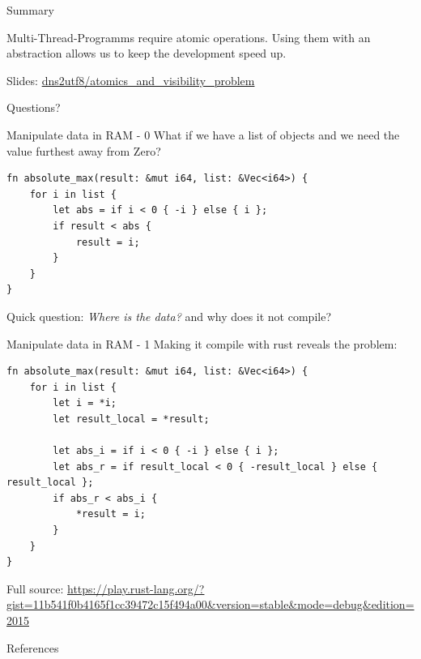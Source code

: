 \documentclass[10pt,aspectratio=169]{beamer}
\newcommand{\themename}{\textbf{\textsc{metropolis}}\xspace}
\begin{document}
\begin{frame}{Summary}

  Multi-Thread-Programms require atomic operations.
  Using them with an abstraction allows us to keep the development speed up.

  \begin{center}Slides: \href{https://github.com/dns2utf8/atomics_and_visibility_problem}{dns2utf8/atomics\_and\_visibility\_problem}\end{center}


\end{frame}

{
\begin{frame}[standout]
  Questions?
\end{frame}
}

\appendix

%
%


\begin{frame}[fragile]{Manipulate data in RAM - 0}
What if we have a list of objects and we need the value furthest away from Zero?
\begin{verbatim}
fn absolute_max(result: &mut i64, list: &Vec<i64>) {
    for i in list {
        let abs = if i < 0 { -i } else { i };
        if result < abs {
            result = i;
        }
    }
}
\end{verbatim}
Quick question: \emph{Where is the data?} and why does it \alert{not} compile?
\end{frame}

\begin{frame}[fragile]{Manipulate data in RAM - 1}
Making it compile with rust reveals the problem:
\begin{verbatim}
fn absolute_max(result: &mut i64, list: &Vec<i64>) {
    for i in list {
        let i = *i;
        let result_local = *result;

        let abs_i = if i < 0 { -i } else { i };
        let abs_r = if result_local < 0 { -result_local } else { result_local };
        if abs_r < abs_i {
            *result = i;
        }
    }
}
\end{verbatim}
Full source: \url{https://play.rust-lang.org/?gist=11b541f0b4165f1cc39472c15f494a00&version=stable&mode=debug&edition=2015}
\end{frame}

\begin{frame}[allowframebreaks]{References}

  
  

\end{frame}
\end{document}
